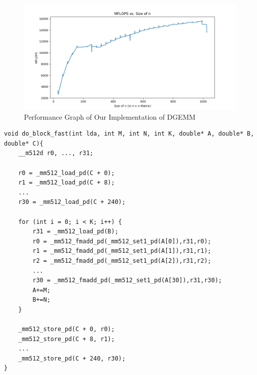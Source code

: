 \documentclass{article}
\begin{document}
\begin{figure}[H]
  \centerline{\includegraphics[width=6in]{figures/MFLOPS.png}}
  \caption{Performance Graph of Our Implementation of DGEMM}
  \label{fig:our-dgemm}
\end{figure}

\label{Alg-2}
\begin{verbatim}
void do_block_fast(int lda, int M, int N, int K, double* A, double* B, double* C){
    __m512d r0, ..., r31;
    
    r0 = _mm512_load_pd(C + 0);
    r1 = _mm512_load_pd(C + 8);
    ...
    r30 = _mm512_load_pd(C + 240);

    for (int i = 0; i < K; i++) {
        r31 = _mm512_load_pd(B);
        r0 = _mm512_fmadd_pd(_mm512_set1_pd(A[0]),r31,r0);
        r1 = _mm512_fmadd_pd(_mm512_set1_pd(A[1]),r31,r1);
        r2 = _mm512_fmadd_pd(_mm512_set1_pd(A[2]),r31,r2);
        ...
        r30 = _mm512_fmadd_pd(_mm512_set1_pd(A[30]),r31,r30);
        A+=M;
        B+=N;
    }

    _mm512_store_pd(C + 0, r0);
    _mm512_store_pd(C + 8, r1);
    ...
    _mm512_store_pd(C + 240, r30);
}
\end{verbatim}
\end{document}

